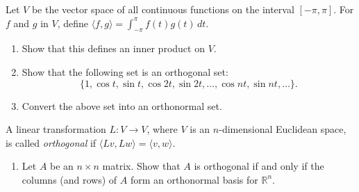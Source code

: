 \documentclass[12pt]{article}
\theoremstyle{remark}
\newtheorem*{solution}{Solution}
\newcommand{\R}{\mathbb{R}}
\renewcommand{\=}{&=&}
\newcommand{\<}{\langle}
\renewcommand{\>}{\rangle}
\begin{document}
\begin{problems}
	



\item
Let $V$ be the vector space of all continuous functions on the interval $[-\pi, \pi]$. For $f$ and
$g$ in $V$, define $\<f,g\> = \int_{-\pi}^\pi f(t) g(t) \, dt$.
\begin{enumerate}
	\item Show that this defines an inner product on $V$.
	
	
	\item Show that the following set is an orthogonal set:
	$$\{1, \cos t, \sin t, \cos 2t, \sin 2t, \ldots, \cos nt, \sin nt, \ldots \}.$$
	
	
	\item Convert the above set into an orthonormal set.
	
\end{enumerate}



\item
A linear transformation $L:V \to V$, where $V$ is an $n$-dimensional Euclidean
space, is called \emph{orthogonal} if $\<Lv,Lw\> = \<v,w\>$.
\begin{enumerate}
	\item Let $A$ be an $n \times n$ matrix. Show that $A$ is orthogonal if and only if the
	columns (and rows) of $A$ form an orthonormal basis for $\R^n$.
	
	

\end{enumerate}
\end{problems}
\end{document}
